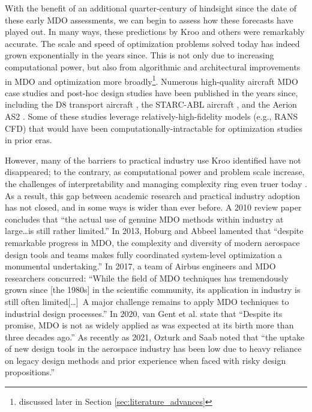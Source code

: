 With the benefit of an additional quarter-century of hindsight since the date of these early MDO assessments, we can begin to assess how these forecasts have played out. In many ways, these predictions by Kroo and others were remarkably accurate. The scale and speed of optimization problems solved today has indeed grown exponentially in the years since. This is not only due to increasing computational power, but also from algorithmic and architectural improvements in MDO and optimization more broadly\footnote{discussed later in Section \ref{sec:literature_advances}}. Numerous high-quality aircraft MDO case studies and post-hoc design studies have been published in the years since, including the D8 transport aircraft \cite{drela_development_2011, drela_tasopt_2010}, the STARC-ABL aircraft \cite{yildirim_performance_2021}, and the Aerion AS2 \cite{bons_highfidelity_2020}. Some of these studies leverage relatively-high-fidelity models (e.g., RANS CFD) that would have been computationally-intractable for optimization studies in prior eras.

However, many of the barriers to practical industry use Kroo identified have not disappeared; to the contrary, as computational power and problem scale increase, the challenges of interpretability and managing complexity ring even truer today \cite{antoine_framework_2005, gpkit, gazaix_industrialization_2017, torenbeek_advanced_2013}. As a result, this gap between academic research and practical industry adoption has not closed, and in some ways is wider than ever before. A 2010 review paper \cite{agte_mdo_2010} concludes that ``the actual use of genuine MDO methods within industry at large\dots is still rather limited.'' In 2013, Hoburg and Abbeel lamented that ``despite remarkable progress in MDO, the complexity and diversity of modern aerospace design tools and teams makes fully coordinated system-level optimization a monumental undertaking.'' \cite{hoburg_geometric_2014} In 2017, a team of Airbus engineers and MDO researchers concurred: ``While the field of MDO techniques has tremendously grown since [the 1980s] in the scientific community, its application in industry is still often limited[\dots]\ A major challenge remains to apply MDO techniques to industrial design processes.'' \cite{gazaix_industrialization_2017} In 2020, van Gent et al. state that ``Despite its promise, MDO is not as widely applied as was expected at its birth more than three decades ago.'' \cite{vangent_knowledge_2020} As recently as 2021, Ozturk and Saab noted that ``the uptake of new design tools in the aerospace industry has been low due to heavy reliance on legacy design methods and prior experience when faced with risky design propositions.'' \cite{ozturk_optimal_2021}


